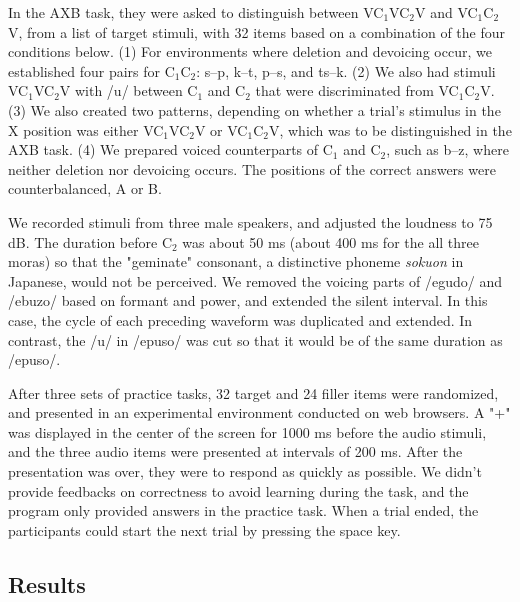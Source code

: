 \documentclass[a4paper,11pt,twocolumn]{article}
\begin{document}
In the AXB task, they were asked to distinguish between VC$_\text{1}$VC$_\text{2}$V and VC$_\text{1}$C$_\text{2}$V, from a list of target stimuli, with 32 items based on a combination of the four conditions below. (1) For environments where deletion and devoicing occur, we established four pairs for C$_\text{1}$C$_\text{2}$: s--p, k--t, p--s, and ts--k. (2) We also had stimuli VC$_\text{1}$VC$_\text{2}$V with /u/ between C$_\text{1}$ and C$_\text{2}$ that were discriminated from VC$_\text{1}$C$_\text{2}$V. (3) We also created two patterns, depending on whether a trial's stimulus in the X position was either VC$_\text{1}$VC$_\text{2}$V or VC$_\text{1}$C$_\text{2}$V, which was to be distinguished in the AXB task. (4) We prepared voiced counterparts of C$_\text{1}$ and C$_\text{2}$, such as b--z, where neither deletion nor devoicing occurs. The positions of the correct answers were counterbalanced, A or B.

We recorded stimuli from three male speakers, and adjusted the loudness to 75 dB. The duration before C$_\text{2}$ was about 50 ms (about 400 ms for the all three moras) so that the "geminate" consonant, a distinctive phoneme \textit{sokuon} in Japanese, would not be perceived. We removed the voicing parts of /egudo/ and /ebuzo/ based on formant and power, and extended the silent interval. In this case, the cycle of each preceding waveform was duplicated and extended. In contrast, the /u/ in /epuso/ was cut so that it would be of the same duration as /epuso/.

After three sets of practice tasks, 32 target and 24 filler items were randomized, and presented in an experimental environment conducted on web browsers. A "+" was displayed in the center of the screen for 1000 ms before the audio stimuli, and the three audio items were presented at intervals of 200 ms. After the presentation was over, they were to respond as quickly as possible. We didn't provide feedbacks on correctness to avoid learning during the task, and the program only provided answers in the practice task. When a trial ended, the participants could start the next trial by pressing the space key.

\subsection{Results}
\end{document}
